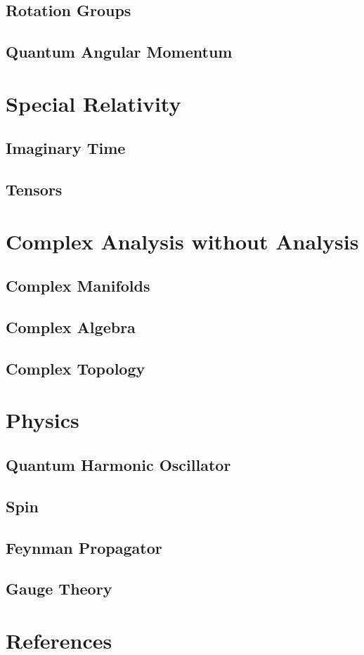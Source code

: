 \documentclass[12pt]{article}
\theoremstyle{definition}
\theoremstyle{remark}
\theoremstyle{example}
\theoremstyle{theorem}
\theoremstyle{lemma}
\begin{document}
\subsection{Rotation Groups}

\subsection{Quantum Angular Momentum}

\section{Special Relativity}

\subsection{Imaginary Time}

\subsection{Tensors}

\section{Complex Analysis without Analysis}

\subsection{Complex Manifolds}

\subsection{Complex Algebra}

\subsection{Complex Topology}

\section{Physics}

\subsection{Quantum Harmonic Oscillator}

\subsection{Spin}

\subsection{Feynman Propagator}

\subsection{Gauge Theory}



\section{References}
\end{document}

